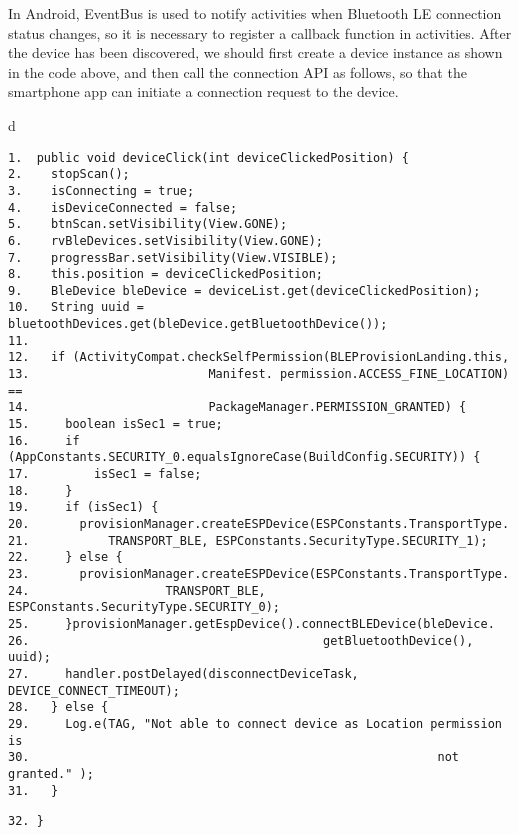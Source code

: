 \documentclass[a4paper,12pt]{book}
\begin{document}
In Android, EventBus is used to notify activities when Bluetooth LE connection status changes, so it is necessary to register a callback function in activities. After the device has been discovered, we should first create a device instance as shown in the code above, and then call the connection API as follows, so that the smartphone app can initiate a connection request to the device.

\begin{codebloc}
\begin{tabular}{d}
\vspace{2pt}
\begin{verbatim}
1.  public void deviceClick(int deviceClickedPosition) {
2.    stopScan();
3.    isConnecting = true;
4.    isDeviceConnected = false;
5.    btnScan.setVisibility(View.GONE);
6.    rvBleDevices.setVisibility(View.GONE);
7.    progressBar.setVisibility(View.VISIBLE);
8.    this.position = deviceClickedPosition;
9.    BleDevice bleDevice = deviceList.get(deviceClickedPosition);
10.   String uuid = bluetoothDevices.get(bleDevice.getBluetoothDevice());
11.
12.   if (ActivityCompat.checkSelfPermission(BLEProvisionLanding.this,
13.                         Manifest. permission.ACCESS_FINE_LOCATION) ==
14.                         PackageManager.PERMISSION_GRANTED) {
15.     boolean isSec1 = true;
16.     if (AppConstants.SECURITY_0.equalsIgnoreCase(BuildConfig.SECURITY)) {
17.         isSec1 = false;
18.     }
19.     if (isSec1) {
20.       provisionManager.createESPDevice(ESPConstants.TransportType.
21.           TRANSPORT_BLE, ESPConstants.SecurityType.SECURITY_1);
22.     } else {
23.       provisionManager.createESPDevice(ESPConstants.TransportType.
24.                   TRANSPORT_BLE, ESPConstants.SecurityType.SECURITY_0);
25.     }provisionManager.getEspDevice().connectBLEDevice(bleDevice.
26.                                         getBluetoothDevice(), uuid);
27.     handler.postDelayed(disconnectDeviceTask, DEVICE_CONNECT_TIMEOUT);
28.   } else {
29.     Log.e(TAG, "Not able to connect device as Location permission is
30.                                                         not granted." );
31.   }
\end{verbatim}
\verb|32. }|
\end{tabular}
\end{codebloc}

\end{document}
